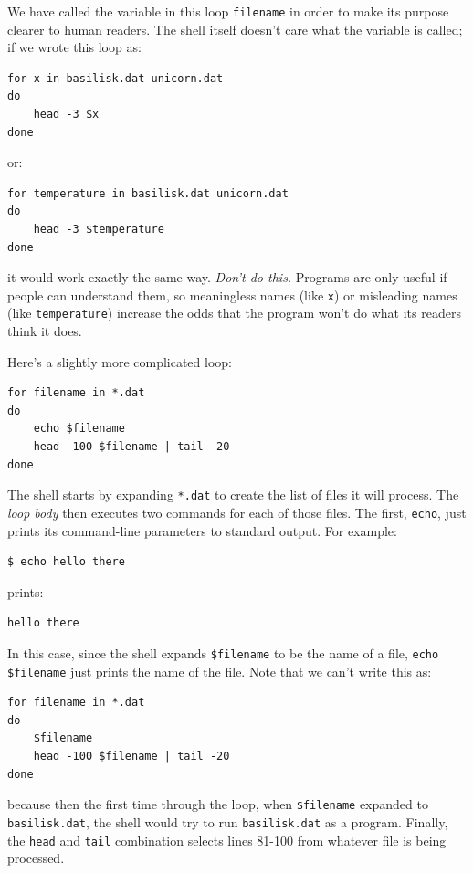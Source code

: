 \documentclass[]{book}
\newcommand{\gdef}[2]{\emph{#2}}
\begin{document}
We have called the variable in this loop \texttt{filename} in order to
make its purpose clearer to human readers. The shell itself doesn't care
what the variable is called; if we wrote this loop as:

\begin{verbatim}
for x in basilisk.dat unicorn.dat
do
    head -3 $x
done
\end{verbatim}

or:

\begin{verbatim}
for temperature in basilisk.dat unicorn.dat
do
    head -3 $temperature
done
\end{verbatim}

it would work exactly the same way. \emph{Don't do this.} Programs are
only useful if people can understand them, so meaningless names (like
\texttt{x}) or misleading names (like \texttt{temperature}) increase the
odds that the program won't do what its readers think it does.

Here's a slightly more complicated loop:

\begin{verbatim}
for filename in *.dat
do
    echo $filename
    head -100 $filename | tail -20
done
\end{verbatim}

The shell starts by expanding \texttt{*.dat} to create the list of files
it will process. The \gdef{g:loop-body}{loop body} then executes two
commands for each of those files. The first, \texttt{echo}, just prints
its command-line parameters to standard output. For example:

\begin{verbatim}
$ echo hello there
\end{verbatim}

prints:

\begin{verbatim}
hello there
\end{verbatim}

In this case, since the shell expands \texttt{\$filename} to be the name
of a file, \texttt{echo \$filename} just prints the name of the file.
Note that we can't write this as:

\begin{verbatim}
for filename in *.dat
do
    $filename
    head -100 $filename | tail -20
done
\end{verbatim}

because then the first time through the loop, when \texttt{\$filename}
expanded to \texttt{basilisk.dat}, the shell would try to run
\texttt{basilisk.dat} as a program. Finally, the \texttt{head} and
\texttt{tail} combination selects lines 81-100 from whatever file is
being processed.
\end{document}

